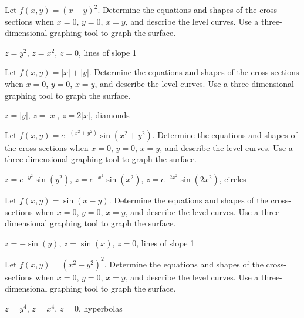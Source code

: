 \begin{exercises}

\begin{exercise} Let $f(x,y)=(x-y)^2$. 
Determine the equations and shapes of the cross-sections when
$x=0$, $y=0$, $x=y$, and describe the level curves.
Use a three-dimensional graphing tool to graph the surface.
\begin{answer} $z=y^2$, $z=x^2$, $z=0$, lines of slope 1
\end{answer}\end{exercise}

\begin{exercise} Let $f(x,y)=|x|+|y|$. 
Determine the equations and shapes of the cross-sections when
$x=0$, $y=0$, $x=y$, and describe the level curves.
Use a three-dimensional graphing tool to graph the surface.
\begin{answer} $z=|y|$, $z=|x|$, $z=2|x|$, diamonds
\end{answer}\end{exercise}

\begin{exercise} Let $f(x,y)=e^{-(x^2+y^2)}\sin(x^2+y^2)$. 
Determine the equations and shapes of the cross-sections when
$x=0$, $y=0$, $x=y$, and describe the level curves.
Use a three-dimensional graphing tool to graph the surface.
\begin{answer} $z=e^{-y^2}\sin(y^2)$, $z=e^{-x^2}\sin(x^2)$, 
$z=e^{-2x^2}\sin(2x^2)$, circles
\end{answer}\end{exercise}

\begin{exercise} Let $f(x,y)=\sin(x-y)$. 
Determine the equations and shapes of the cross-sections when
$x=0$, $y=0$, $x=y$, and describe the level curves.
Use a three-dimensional graphing tool to graph the surface.
\begin{answer} $z=-\sin(y)$, $z=\sin(x)$, 
$z=0$, lines of slope 1
\end{answer}\end{exercise}

\begin{exercise} Let $f(x,y)=(x^2-y^2)^2$. 
Determine the equations and shapes of the cross-sections when
$x=0$, $y=0$, $x=y$, and describe the level curves.
Use a three-dimensional graphing tool to graph the surface.
\begin{answer} $z=y^4$, $z=x^4$, 
$z=0$, hyperbolas
\end{answer}\end{exercise}


\end{exercises}
